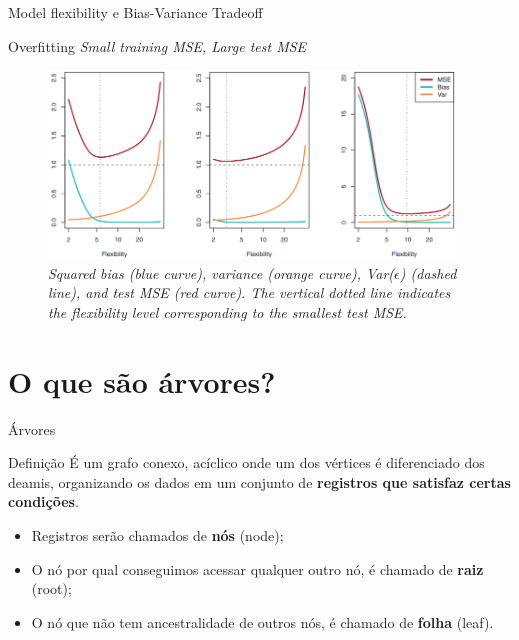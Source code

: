 \documentclass{beamer}
\begin{document}
\begin{frame}{Model flexibility e Bias-Variance Tradeoff}
\begin{alertblock}{Overfitting}
 \textit{Small training MSE, Large test MSE}
 
\end{alertblock}
    \begin{figure}
        \centering
        \includegraphics[height=5cm]{pic/mse_bias_var.png}
        \caption{\scriptsize \textit{Squared bias (blue curve), variance (orange curve), Var($\epsilon$) (dashed line), and test MSE (red curve). The vertical dotted line indicates the flexibility level corresponding to the smallest test MSE.}}
        \label{fig:my_label}
    \end{figure}
\end{frame}
\section{O que são árvores?}

    \begin{frame}[t]{Árvores}
    \vspace{1em}
    \begin{block}{Definição}
        É um grafo conexo, acíclico onde um dos vértices é diferenciado dos deamis, organizando os dados em um conjunto de \textbf{registros que satisfaz certas condições}.
    \end{block} \vspace{1.5em}
        \begin{itemize}
            \item Registros serão chamados de \textbf{nós} (node);
            \item O nó por qual conseguimos acessar qualquer outro nó, é chamado de \textbf{raiz} (root);
            \item O nó que não tem ancestralidade de outros nós, é chamado de \textbf{folha} (leaf).
        \end{itemize}
    \end{frame}
\end{document}
